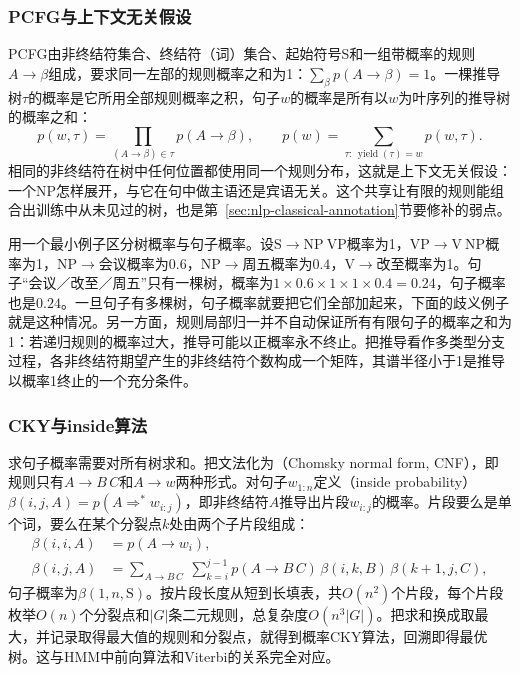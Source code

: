\subsubsection{PCFG与上下文无关假设}
\label{sec:nlp-classical-pcfg-definition}

PCFG由非终结符集合、终结符（词）集合、起始符号S和一组带概率的规则$A\to\beta$组成，要求同一左部的规则概率之和为1：$\sum_{\beta}p(A\to\beta)=1$。一棵推导树$\tau$的概率是它所用全部规则概率之积，句子$w$的概率是所有以$w$为叶序列的推导树的概率之和：
\begin{equation}
  p(w,\tau)=\prod_{(A\to\beta)\in\tau}p(A\to\beta),\qquad
  p(w)=\sum_{\tau:\,\operatorname{yield}(\tau)=w}p(w,\tau).
  \label{eq:nlp-classical-pcfg}
\end{equation}
相同的非终结符在树中任何位置都使用同一个规则分布，这就是上下文无关假设：一个NP怎样展开，与它在句中做主语还是宾语无关。这个共享让有限的规则能组合出训练中从未见过的树，也是第~\ref{sec:nlp-classical-annotation}节要修补的弱点。

用一个最小例子区分树概率与句子概率。设$\mathrm S\to\mathrm{NP}\ \mathrm{VP}$概率为1，$\mathrm{VP}\to\mathrm V\ \mathrm{NP}$概率为1，$\mathrm{NP}\to$会议概率为$0.6$，$\mathrm{NP}\to$周五概率为$0.4$，$\mathrm V\to$改至概率为1。句子“会议／改至／周五”只有一棵树，概率为$1\times0.6\times1\times1\times0.4=0.24$，句子概率也是$0.24$。一旦句子有多棵树，句子概率就要把它们全部加起来，下面的歧义例子就是这种情况。另一方面，规则局部归一并不自动保证所有有限句子的概率之和为1：若递归规则的概率过大，推导可能以正概率永不终止。把推导看作多类型分支过程，各非终结符期望产生的非终结符个数构成一个矩阵，其谱半径小于1是推导以概率1终止的一个充分条件。

\subsubsection{CKY与inside算法}
\label{sec:nlp-classical-cky}

求句子概率需要对所有树求和。把文法化为（Chomsky normal form, CNF），即规则只有$A\to B\,C$和$A\to w$两种形式。对句子$w_{1:n}$定义（inside probability）$\beta(i,j,A)=p(A\Rightarrow^{*}w_{i:j})$，即非终结符$A$推导出片段$w_{i:j}$的概率。片段要么是单个词，要么在某个分裂点$k$处由两个子片段组成：
\begin{equation}
  \begin{aligned}
    \beta(i,i,A)&=p(A\to w_i),\\
    \beta(i,j,A)&=\sum_{A\to B\,C}\ \sum_{k=i}^{j-1}p(A\to B\,C)\,\beta(i,k,B)\,\beta(k+1,j,C),
  \end{aligned}
  \label{eq:nlp-classical-inside}
\end{equation}
句子概率为$\beta(1,n,\mathrm S)$。按片段长度从短到长填表，共$O(n^2)$个片段，每个片段枚举$O(n)$个分裂点和$|G|$条二元规则，总复杂度$O(n^3|G|)$。把求和换成取最大，并记录取得最大值的规则和分裂点，就得到概率CKY算法，回溯即得最优树。这与HMM中前向算法和Viterbi的关系完全对应。

